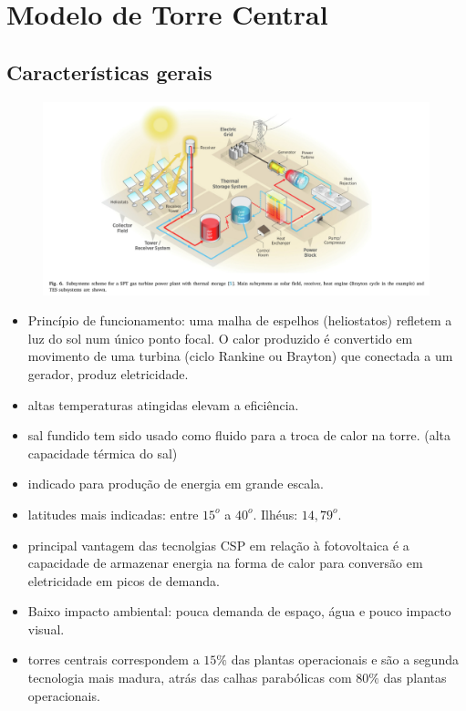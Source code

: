 \documentclass[12pt,notheorems,hyperref={pdfauthor=Professor Rafael Nardi}]{beamer}
\begin{document}
\section{Modelo de Torre Central}

\subsection{Características gerais}

\begin{frame}%
	\begin{figure}
		\centering
		\includegraphics[scale=0.268]{./sistema_usina.png}
	\end{figure}
\end{frame}

\begin{frame}%
	\begin{itemize}
		\item Princípio de funcionamento: uma malha de espelhos (heliostatos)
			refletem a luz do sol num único ponto focal. O calor produzido é
			convertido em movimento de uma turbina (ciclo Rankine ou Brayton) que
			conectada a um gerador, produz eletricidade.\pause
		\item altas temperaturas atingidas elevam a eficiência.\pause
		\item sal fundido tem sido usado como fluido para a troca de calor na
			torre. (alta capacidade térmica do sal) \pause
		\item indicado para produção de energia em grande escala.\pause
		\item latitudes mais indicadas: entre $15^o$ a $40^o$. Ilhéus: $14,79^o$.\pause
		\item principal vantagem das tecnolgias CSP em relação à fotovoltaica é a
			capacidade de armazenar energia na forma de calor para conversão em
			eletricidade em picos de demanda.\pause
		\item Baixo impacto ambiental: pouca demanda de espaço, água e pouco impacto visual.\pause
		\item torres centrais correspondem a $15\%$ das plantas operacionais e são
			a segunda tecnologia mais madura, atrás das calhas parabólicas com
			$80\%$ das plantas operacionais.
	\end{itemize}
\end{frame}
\end{document}
